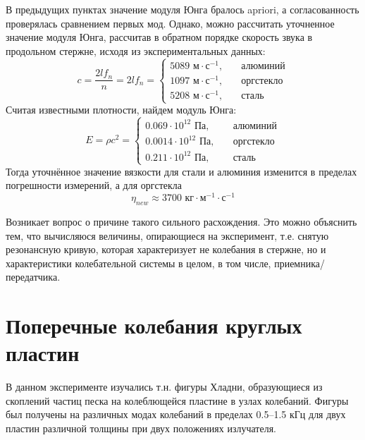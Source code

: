 \documentclass[a4paper,14pt]{extarticle}
\begin{document}
В предыдущих пунктах значение модуля Юнга бралось apriori, а согласованность проверялась сравнением первых мод. Однако, можно рассчитать уточненное значение модуля Юнга, рассчитав в обратном порядке скорость звука в продольном стержне, исходя из экспериментальных данных:
\begin{equation}
	c=\frac{2l f_n}{n}=2lf_n=
	\left\{
	\begin{aligned}
		5089 \text{ м}\cdot\text{с}^{-1},&\quad \text{алюминий}\\
		1097 \text{ м}\cdot\text{с}^{-1},&\quad \text{оргстекло}\\
		5208 \text{ м}\cdot\text{с}^{-1},&\quad \text{сталь}
	\end{aligned}
	\right.
\end{equation}
Считая известными плотности, найдем модуль Юнга:
\begin{equation}
	E = \rho c^2=
	\left\{
	\begin{aligned}
		0.069\cdot 10^{12}\text{ Па},&\quad \text{алюминий}\\
		0.0014\cdot 10^{12}\text{ Па},&\quad \text{оргстекло}\\
		0.211\cdot 10^{12}\text{ Па},&\quad \text{сталь}
	\end{aligned}
	\right.
\end{equation}
Тогда уточнённое значение вязкости для стали и алюминия изменится в пределах погрешности измерений, а для оргстекла
\begin{equation}
	\eta_{new}\approx 3700 \text{ кг}\cdot\text{м}^{-1}\cdot\text{с}^{-1}
\end{equation}

Возникает вопрос о причине такого сильного расхождения. Это можно объяснить тем, что вычисляюся величины, опирающиеся на эксперимент, т.е. снятую резонансную кривую, которая характеризует не колебания в стержне, но и характеристики колебательной системы в целом, в том числе, приемника/передатчика.

\newpage

\section{Поперечные колебания круглых пластин}

В данном эксперименте изучались т.н. фигуры Хладни, образующиеся из скоплений частиц песка на колеблющейся пластине в узлах колебаний. Фигуры был получены на различных модах колебаний в пределах 0.5--1.5 кГц для двух пластин различной толщины при двух положениях излучателя.
\end{document}
